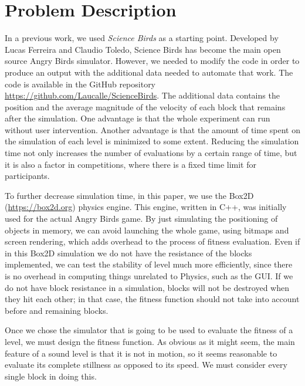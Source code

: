 \documentclass[a4paper,twoside]{article}
\begin{document}
\section{Problem Description}
\label{sec:angry}

In a previous work, we used {\em Science Birds}
\cite{ferreira2014search}  as a starting point. Developed by Lucas
Ferreira and Claudio Toledo, Science Birds has become the main open
source Angry Birds simulator. However, we needed to modify the code in
order to produce an output with the additional data needed to automate
that work. The code is available in the GitHub repository
\url{https://github.com/Laucalle/ScienceBirds}. The additional data
contains the position and the average magnitude of the velocity of
each block that remains after the simulation. One advantage is that
the whole experiment can run without user intervention. Another
advantage is that the amount of time spent on the simulation of each
level is minimized to some extent.  Reducing the simulation time not
only increases the number of evaluations by a certain range of time,
but it is also a factor in competitions, where there is a fixed time
limit for participants. 


To further decrease simulation time, in this paper, we use the Box2D
(\url{https://box2d.org}) physics engine. This engine, written in C++,
was initially used for the actual Angry Birds game. By just simulating
the positioning of objects in memory, we can avoid launching the whole
game, using bitmaps and screen rendering, which adds overhead to the
process of fitness evaluation. Even if in this Box2D simulation we do
not have the resistance of the blocks implemented, we can test the
stability of level much more efficiently, since there is no overhead
in computing things unrelated to Physics, such as the GUI. If we do
not have block resistance in a simulation, blocks will not be
destroyed when they hit each other; in that case, the fitness function
should not take into account before and remaining blocks. 


Once we chose the simulator that is going to be used to evaluate the fitness of a level, we must design the fitness function. As obvious as it might seem, the main feature of a sound level is that it is not in motion, so it seems reasonable to evaluate its complete stillness as opposed to its speed. We must consider every single block in doing this. 
\end{document}
